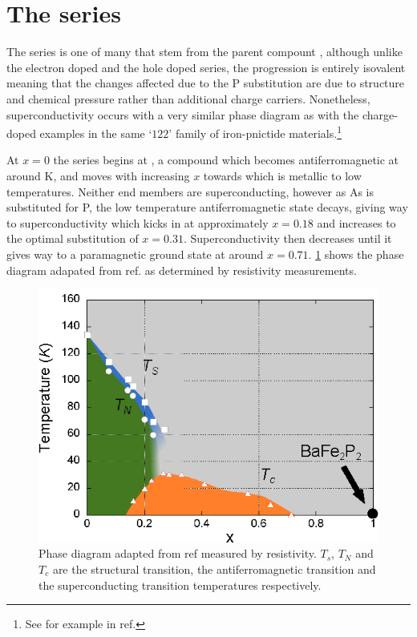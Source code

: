 
\section{The \BaFePAs series}

The \BaFePAs series is one of many that stem from the parent compount \BaFeAs, although unlike the electron doped \BaCoFeAs and the hole doped \BaKFeAs series, the \BaFePAs progression is entirely isovalent meaning that the changes affected due to the P substitution are due to structure and chemical pressure rather than additional charge carriers. Nonetheless, superconductivity occurs with a very similar phase diagram as with the charge-doped examples in the same `$122$' family of iron-pnictide materials.\footnote{See for example  in ref.\cite{Paglione2010}}

At $x=0$ the \BaFePAs series begins at \BaFeAs, a compound which becomes antiferromagnetic at around \unit[138]{K}, and moves with increasing $x$ towards \BaFeP which is metallic to low temperatures. Neither end members are superconducting, however as As is substituted for P, the low temperature antiferromagnetic state decays, giving way to superconductivity which kicks in at approximately $x=0.18$ and increases to the optimal substitution of $x=0.31$. Superconductivity then decreases until it gives way to a paramagnetic ground state at around $x=0.71$. \Fig\ref{Fig:3:PhaseDiagram} shows the phase diagram adapated from ref. \cite{Nakai2010a} as determined by resistivity measurements.

\begin{figure}
    \begin{center}
        \includegraphics[scale=1.0]{Chapter3-dHvABaFe2P2/Figures/BaFe2P2Series/PhaseDiagram/PhaseDiagram}
        \caption{Phase diagram adapted from ref \cite{Nakai2010a} measured by resistivity. $T_s$, $T_N$ and $T_c$ are the structural transition, the antiferromagnetic transition and the superconducting transition temperatures respectively.}
        \label{Fig:3:PhaseDiagram}
    \end{center}
\end{figure}

